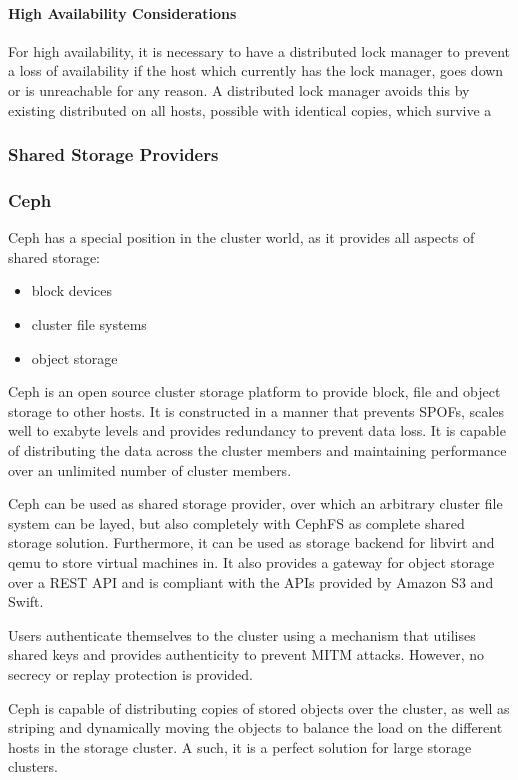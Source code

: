 \paragraph{High Availability Considerations}
For high availability, it is necessary to have a distributed lock manager to prevent
a loss of availability if the host which currently has the lock manager, goes down or
is unreachable for any reason. A distributed lock manager avoids this by existing
distributed on all hosts, possible with identical copies, which survive a 
\subsubsection{Shared Storage Providers}
\subsubsection{Ceph}
Ceph has a special position in the cluster world, as it provides all aspects of shared storage:
\begin{itemize}
\item block devices
\item cluster file systems
\item object storage
\end{itemize}

Ceph is an open source cluster storage platform to provide block, file and object storage to other hosts. It is constructed in a manner that prevents \acp{SPOF}, scales well to exabyte levels and provides redundancy to prevent data loss. It is capable of distributing the data across the cluster members and maintaining performance over an unlimited number of cluster members.

Ceph can be used as shared storage provider, over which an arbitrary cluster file system can be layed, but also completely with CephFS as complete shared storage solution. Furthermore, it can be used as storage backend for libvirt and qemu to store virtual machines in. It also provides a gateway for object storage over a REST API and is compliant with the APIs provided by Amazon S3 and Swift.\cite{ceph_architecture}

Users authenticate themselves to the cluster using a mechanism that utilises shared keys and provides authenticity to prevent \ac{MITM} attacks. However, no secrecy or replay protection is provided\cite{ceph_architecture}\cite{crush}.

Ceph is capable of distributing copies of stored objects over the cluster, as well as striping and dynamically moving the objects to balance the load on the different hosts in the storage cluster. A such, it is a perfect solution for large storage clusters.

